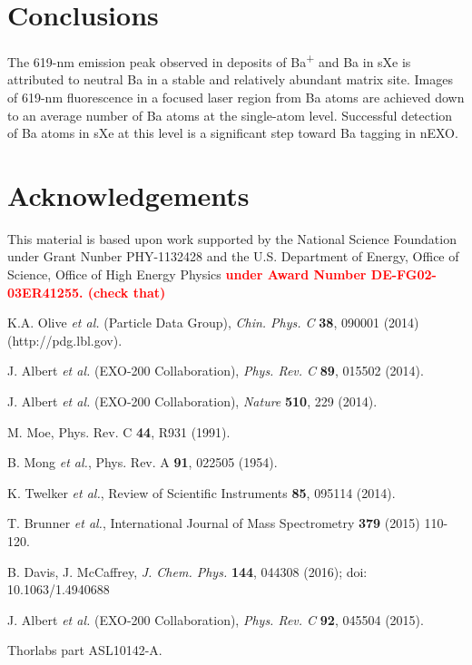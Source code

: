 \documentclass[aps,pra,reprint,superscriptaddress]{revtex4-1}
\begin{document}


\section{Conclusions}

The 619-nm emission peak observed in deposits of Ba\textsuperscript{+} and Ba in sXe is attributed to neutral Ba in a stable and relatively abundant matrix site.
Images of 619-nm fluorescence in a focused laser region from Ba atoms are achieved down to an average number of Ba atoms at the single-atom level.  Successful detection of Ba atoms in sXe at this level is a significant step toward Ba tagging in nEXO. 

\section*{Acknowledgements}

This material is based upon work supported by the National Science Foundation under Grant Nunber PHY-1132428 and the U.S. Department of Energy, Office of Science, Office of High Energy Physics \textbf{\textcolor{red}{under Award Number DE-FG02-03ER41255. (check that)}}

%
\begin{thebibliography}{00}
  K.A. Olive \emph{et al.} (Particle Data Group), \emph{Chin. Phys. C} \textbf{38}, 090001 (2014) (http://pdg.lbl.gov).


 J. Albert \emph{et al.} (EXO-200 Collaboration), \emph{Phys. Rev. C} \textbf{89}, 015502 (2014).

 J. Albert \emph{et al.} (EXO-200 Collaboration), \emph{Nature} \textbf{510}, 229 (2014).

 M. Moe, Phys. Rev. C \textbf{44}, R931 (1991).

 B. Mong \emph{ et al.}, Phys. Rev. A \textbf{91}, 022505 (1954).

 K. Twelker \emph{ et al.}, Review of Scientific Instruments \textbf{85}, 095114 (2014).

 T. Brunner \emph{ et al.}, International Journal of Mass Spectrometry {\color{red}\textbf{379} (2015) 110-120.}

 B. Davis, J. McCaffrey, \emph{J. Chem. Phys.} \textbf{144}, 044308 (2016); doi: 10.1063/1.4940688

 J. Albert \emph{et al.} (EXO-200 Collaboration), \emph{Phys. Rev. C} \textbf{92}, 045504 (2015).

 Thorlabs part ASL10142-A.
\end{thebibliography}
\end{document}
